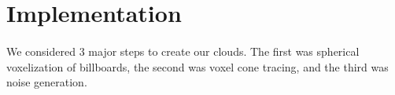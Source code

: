 

\newpage
\section{Implementation}\paragraph{}
We considered 3 major steps to create our clouds. The first was spherical voxelization of billboards, the second was voxel cone tracing, and the third was noise generation.




